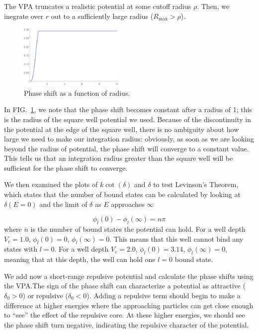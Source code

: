 \documentclass[10pt,showpacs,preprintnumbers,footinbib,amsmath,amssymb,aps,prl,twocolumn,groupedaddress,superscriptaddress,showkeys]{revtex4-1}
\begin{document}
The VPA truncates a realistic potential at some cutoff radius $\rho$.
Then, we inegrate over $r$ out to a sufficiently large radius ($R_{\mathrm{max}} > \rho$). 

\begin{figure}
\centering
\includegraphics[width=0.45\textwidth]{figures/VPA_plot.pdf}
\caption{Phase shift as a function of radius.}
\label{fig:VPA}
\end{figure}
In FIG.~\ref{fig:VPA}, we note that the phase shift becomes constant after a radius of 1;
this is the radius of the square well potential we used. Because of the discontinuity in the potential at the
edge of the square well, there is no ambiguity about how large we need to make our integration
radius: obviously, as soon as we are looking beyond the radius of potential, the phase shift will
converge to a constant value. This tells us that an integration radius greater than the square well 
will be sufficient for the phase shift to converge.

We then examined the plots of $k\cot(\delta)$ and $\delta$ to test Levinson's Theorem,
which states that the number of bound states can be calculated by looking at $\delta(E=0)$
and the limit of $\delta$ as $E$ approaches $\infty$

\begin{equation*}
	\phi_l(0)-\phi_l(\infty)=n\pi
\end{equation*}
where $n$ is the number of bound states the potential can hold. For a well depth $V_c=1.0$,
$\phi_l(0)=0$,  $\phi_l(\infty)=0$. This means that this well cannot bind any states
with $l=0$. For a well depth $V_c=2.0$, $\phi_l(0)=3.14$,  $\phi_l(\infty)=0$,
meaning that at this depth, the well can hold one $l=0$ bound state.

We add now a short-range repulsive potential and calculate the phase shifts using the VPA.The
sign of the phase shift can characterize a potential as attractive ($\delta_0>0$) or repulsive
($\delta_0<0$). Adding a repulsive term should begin to make a difference at higher
energies where the approaching particles can get close enough to ``see'' the effect of
the repulsive core. At these higher energies, we should see the phase shift turn negative,
indicating the repulsive character of the potential.
\end{document}
